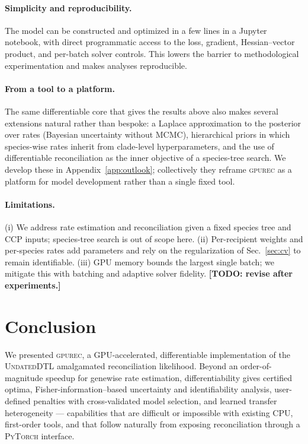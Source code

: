 \documentclass[11pt]{article}
\newcommand{\toolname}{\textsc{gpurec}\xspace}
\newcommand{\TODO}[1]{{\color{red!70!black}\textbf{[TODO: #1]}}}
\begin{document}
\paragraph{Simplicity and reproducibility.} The model can be constructed and
optimized in a few lines in a Jupyter notebook, with direct programmatic access
to the loss, gradient, Hessian--vector product, and per-batch solver controls.
This lowers the barrier to methodological experimentation and makes analyses
reproducible.

\paragraph{From a tool to a platform.} The same differentiable core that gives
the results above also makes several extensions natural rather than bespoke: a
Laplace approximation to the posterior over rates (Bayesian uncertainty without
MCMC), hierarchical priors in which species-wise rates inherit from clade-level
hyperparameters, and the use of differentiable reconciliation as the inner
objective of a species-tree search. We develop these in
Appendix~\ref{app:outlook}; collectively they reframe \toolname as a platform
for model development rather than a single fixed tool.

\paragraph{Limitations.} (i) We address rate estimation and reconciliation
given a fixed species tree and CCP inputs; species-tree search is out of scope
here. (ii) Per-recipient weights and per-species rates add parameters and rely
on the regularization of Sec.~\ref{sec:cv} to remain identifiable. (iii) GPU
memory bounds the largest single batch; we mitigate this with batching and
adaptive solver fidelity. \TODO{revise after experiments.}

\section{Conclusion}
\label{sec:conclusion}
We presented \toolname, a GPU-accelerated, differentiable implementation of the
\textsc{UndatedDTL} amalgamated reconciliation likelihood. Beyond an
order-of-magnitude speedup for genewise rate estimation, differentiability
gives certified optima, Fisher-information--based uncertainty and
identifiability analysis, user-defined penalties with cross-validated model
selection, and learned transfer heterogeneity --- capabilities that are
difficult or impossible with existing CPU, first-order tools, and that follow
naturally from exposing reconciliation through a \textsc{PyTorch} interface.
\end{document}
